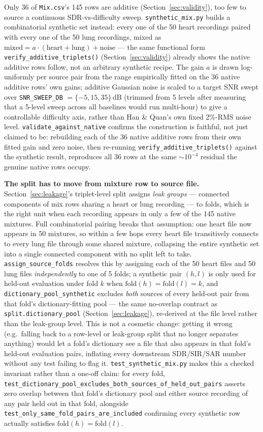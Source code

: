 \documentclass[11pt]{article}
\begin{document}
Only 36 of \texttt{Mix.csv}'s 145 rows are additive
(Section~\ref{sec:validity}), too few to source a continuous
SDR-vs-difficulty sweep. \texttt{synthetic\_mix.py} builds a combinatorial
synthetic set instead: every one of the 50 heart recordings paired with
every one of the 50 lung recordings, mixed as
$\text{mixed} = a\cdot(\text{heart}+\text{lung}) + \text{noise}$ --- the same
functional form \texttt{verify\_additive\_triplets()}
(Section~\ref{sec:validity}) already shows the native additive rows follow,
not an arbitrary synthetic recipe. The gain $a$ is drawn log-uniformly per
source pair from the range empirically fitted on the 36 native additive
rows' own gains; additive Gaussian noise is scaled to a target SNR swept
over \texttt{SNR\_SWEEP\_DB} $= \{-5, 15, 35\}$\,dB (trimmed from 5 levels
after measuring that a 5-level sweep across all baselines would run
multi-hour) to give a controllable difficulty axis, rather than Han \&
Quan's own fixed 2\%-RMS noise level. \texttt{validate\_against\_native}
confirms the construction is faithful, not just claimed to be: rebuilding
each of the 36 native additive rows from their own fitted gain and zero
noise, then re-running \texttt{verify\_additive\_triplets()} against the
synthetic result, reproduces all 36 rows at the same $\sim 10^{-4}$ residual
the genuine native rows occupy.

\textbf{The split has to move from mixture row to source file.}
Section~\ref{sec:leakage}'s triplet-level split assigns \emph{leak
groups} --- connected components of mix rows sharing a heart or lung
recording --- to folds, which is the right unit when each recording appears
in only a few of the 145 native mixtures. Full combinatorial pairing breaks
that assumption: one heart file now appears in 50 mixtures, so within a few
hops every heart file transitively connects to every lung file through some
shared mixture, collapsing the entire synthetic set into a single connected
component with no split left to take. \texttt{assign\_source\_folds}
resolves this by assigning each of the 50 heart files and 50 lung files
\emph{independently} to one of 5 folds; a synthetic pair $(h,l)$ is only
used for held-out evaluation under fold $k$ when
$\text{fold}(h) = \text{fold}(l) = k$, and
\texttt{dictionary\_pool\_synthetic} excludes \emph{both} sources of every
held-out pair from that fold's dictionary-fitting pool --- the same
no-overlap contract as \texttt{split.dictionary\_pool}
(Section~\ref{sec:leakage}), re-derived at the file level rather than the
leak-group level. This is not a cosmetic change: getting it wrong (e.g.\
falling back to a row-level or leak-group split that no longer separates
anything) would let a fold's dictionary see a file that also appears in
that fold's held-out evaluation pairs, inflating every downstream SDR/SIR/SAR
number without any test failing to flag it. \texttt{test\_synthetic\_mix.py}
makes this a checked invariant rather than a one-off claim: for every fold,
\texttt{test\_dictionary\_pool\_excludes\_both\_sources\_of\_held\_out\_pairs}
asserts zero overlap between that fold's dictionary pool and either source
recording of any pair held out in that fold, alongside
\texttt{test\_only\_same\_fold\_pairs\_are\_included} confirming every
synthetic row actually satisfies $\text{fold}(h){=}\text{fold}(l)$.
\end{document}
